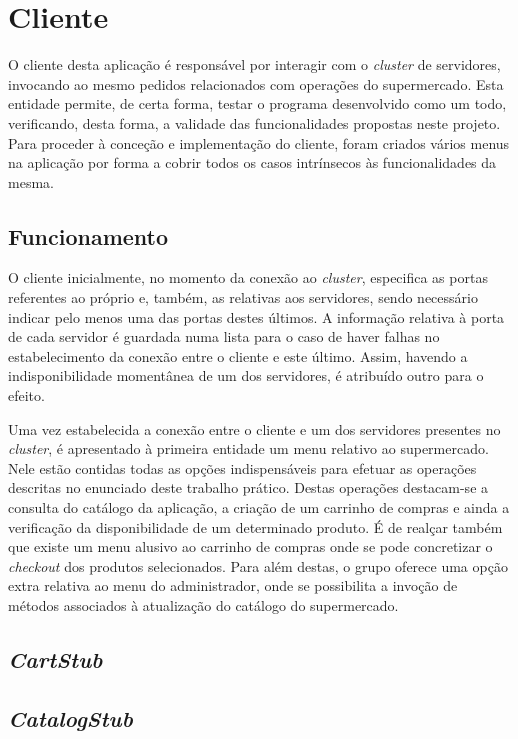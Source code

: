 \documentclass[a4paper]{report}
\begin{document}
{	\section{Cliente} \label{sec:Client}
		O cliente desta aplicação é responsável por interagir com o \textit{cluster} de servidores, invocando ao mesmo pedidos relacionados com operações do supermercado.
		Esta entidade permite, de certa forma, testar o programa desenvolvido como um todo, verificando, desta forma, a validade das funcionalidades propostas neste projeto.
		Para proceder à conceção e implementação do cliente, foram criados vários menus na aplicação por forma a cobrir todos os casos intrínsecos às funcionalidades da mesma.

		\subsection{Funcionamento} \label{subsec:ClientWorking}
		O cliente inicialmente, no momento da conexão ao \textit{cluster}, especifica as portas referentes ao próprio e, também, as relativas aos servidores, sendo necessário indicar pelo menos uma das portas destes últimos.
		A informação relativa à porta de cada servidor é guardada numa lista para o caso de haver falhas no estabelecimento da conexão entre o cliente e este último. Assim, havendo a indisponibilidade momentânea de um dos servidores, é atribuído outro para o efeito.

		Uma vez estabelecida a conexão entre o cliente e um dos servidores presentes no \textit{cluster}, é apresentado à primeira entidade um menu relativo ao supermercado. Nele estão contidas todas as opções indispensáveis para efetuar as operações descritas no enunciado deste trabalho prático.
		Destas operações destacam-se a consulta do catálogo da aplicação, a criação de um carrinho de compras e ainda a verificação da disponibilidade de um determinado produto.
		É de realçar também que existe um menu alusivo ao carrinho de compras onde se pode concretizar o \textit{checkout} dos produtos selecionados.
		Para além destas, o grupo oferece uma opção extra relativa ao menu do administrador, onde se possibilita a invoção de métodos associados à atualização do catálogo do supermercado.

		\subsection{\textit{CartStub}} \label{subsec:ClientCartStub}


		\subsection{\textit{CatalogStub}} \label{subsec:ClientCatalogStub}

}
\end{document}
